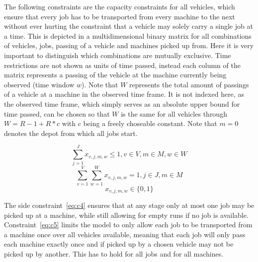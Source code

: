 The following constraints are the capacity constraints for all vehicles, which ensure that every job has to be transported from every machine to the
next without ever hurting the constraint that a vehicle may solely carry a single job at a time. This is depicted in a multidimensional binary matrix
for all combinations of vehicles, jobs, passing of a vehicle and machines picked up from. Here it is very important to distinguish which combinations are mutually exclusive.
Time restrictions are not shown as units of time passed, instead each column of the matrix represents a passing of the vehicle at the machine currently
being observed (time window \(w\)). Note that \(W\) represents the total amount of passings of a vehicle at a machine in the observed time frame. It
is not indexed here, as the observed time frame, which simply serves as an absolute upper bound for time passed, can be chosen so that \(W\) is the same
for all vehicles through \(W = R - 1 + R * c\) with \(c\) being a freely choseable constant. Note that \(m = 0\) denotes the depot from which all jobs
start.

\begin{equation} \label{eq:c4}
 \sum_{j=1}^{J}x_{v,j,m,w} \leq 1, v \in V, m \in M, w \in W
\end{equation}
\begin{equation} \label{eq:c5}
 \sum_{v=1}^{V}\sum_{w=1}^{W}x_{v,j,m,w} = 1, j \in J, m \in M
\end{equation}
\begin{equation} \label{eq:c6}
 x_{v,j,m,w} \in \{0,1\}
\end{equation}

The side constraint~\ref{eq:c4} ensures that at any stage only at most one job may be picked up at a machine, while still allowing for empty runs if no job
is available. Constraint~\ref{eq:c5} limits the model to only allow each job to be transported from a machine once over all vehicles available, meaning that
each job will only pass each machine exactly once and if picked up by a chosen vehicle may not be picked up by another. This has to hold for all jobs
and for all machines.

